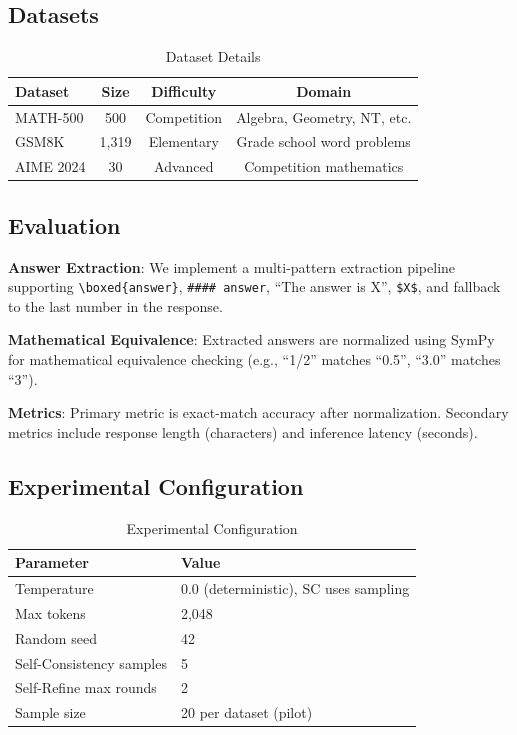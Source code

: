 \documentclass[conference]{IEEEtran}
\begin{document}
\subsection{Datasets}

\begin{table}[h]
\centering
\caption{Dataset Details}
\label{tab:datasets}
\begin{tabular}{lccc}
\toprule
\textbf{Dataset} & \textbf{Size} & \textbf{Difficulty} & \textbf{Domain} \\
\midrule
MATH-500 & 500 & Competition & Algebra, Geometry, NT, etc. \\
GSM8K & 1,319 & Elementary & Grade school word problems \\
AIME 2024 & 30 & Advanced & Competition mathematics \\
\bottomrule
\end{tabular}
\end{table}

\subsection{Evaluation}

\textbf{Answer Extraction}: We implement a multi-pattern extraction pipeline supporting \texttt{\textbackslash boxed\{answer\}}, \texttt{\#\#\#\# answer}, ``The answer is X'', \texttt{\$X\$}, and fallback to the last number in the response.

\textbf{Mathematical Equivalence}: Extracted answers are normalized using SymPy for mathematical equivalence checking (e.g., ``1/2'' matches ``0.5'', ``3.0'' matches ``3'').

\textbf{Metrics}: Primary metric is exact-match accuracy after normalization. Secondary metrics include response length (characters) and inference latency (seconds).

\subsection{Experimental Configuration}

\begin{table}[h]
\centering
\caption{Experimental Configuration}
\label{tab:config}
\begin{tabular}{ll}
\toprule
\textbf{Parameter} & \textbf{Value} \\
\midrule
Temperature & 0.0 (deterministic), SC uses sampling \\
Max tokens & 2,048 \\
Random seed & 42 \\
Self-Consistency samples & 5 \\
Self-Refine max rounds & 2 \\
Sample size & 20 per dataset (pilot) \\
\bottomrule
\end{tabular}
\end{table}
\end{document}
